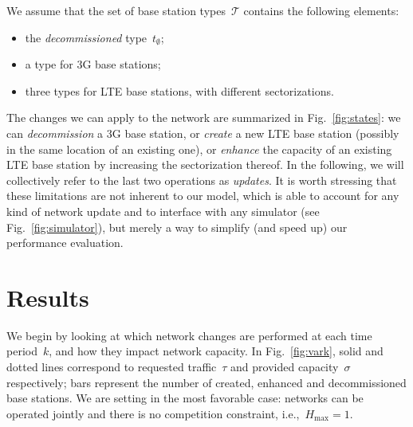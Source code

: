 \documentclass[10pt,journal,cspaper,compsoc]{IEEEtran}
\newcommand{\Fig}[1]{Fig.~\ref{fig:#1}}
\newcommand{\Tc}{\mathcal{T}}
\begin{document}
We assume that the set of base station types~$\Tc$ contains the following elements:
\begin{itemize}
\item the {\em decommissioned} type~$t_\emptyset$;
\item a type for 3G base stations;
\item three types for LTE base stations, with different sectorizations.
\end{itemize}
The changes we can apply to the network are summarized in \Fig{states}: we can {\em decommission}
a 3G base station, or {\em create} a new LTE base station (possibly in the same location of an
existing one), or {\em enhance} the capacity of an existing LTE base station by increasing
the sectorization thereof.
In the following, we will collectively refer to the last two operations as {\em updates}.
It is worth stressing that these limitations are not inherent to our model,
which is able to account for any kind of network update and to interface with any simulator
(see \Fig{simulator}), but merely a way to simplify (and speed up) our performance evaluation.

\section{Results}
\label{sec:results}

\begin{figure*}[t]
\centering
{}
\caption{
Changes applied to the network and requested and provided capacity for each time
period~$k$, when (a)~$N=4~(=N_{\min})$, (b)~$N=16$, (c)~$N=32$.
\label{fig:vark}
}
\end{figure*}

We begin by looking at which network changes are performed at each time period~$k$, and how they impact network capacity.
In \Fig{vark}, solid and dotted lines correspond to requested traffic~$\tau$ and provided capacity~$\sigma$ respectively;
bars represent the number of
created, enhanced and decommissioned base stations.
We are setting in the most favorable case: networks can be operated jointly and there is no competition constraint, i.e.,~$H_{\max}=1$.
\end{document}
